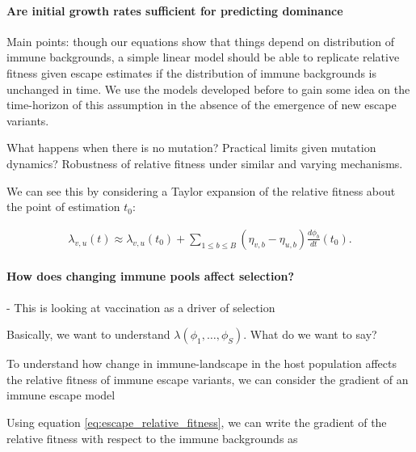 \documentclass[12pt,oneside,letterpaper]{article}
\begin{document}
\paragraph{Are initial growth rates sufficient for predicting dominance}%

Main points: though our equations show that things depend on distribution of immune backgrounds, a simple linear model should be able to replicate relative fitness given escape estimates if the distribution of immune backgrounds is unchanged in time.
We use the models developed before to gain some idea on the time-horizon of this assumption in the absence of the emergence of new escape variants.

What happens when there is no mutation? Practical limits given mutation dynamics?
Robustness of relative fitness under similar and varying mechanisms.

We can see this by considering a Taylor expansion of the relative fitness about the point of estimation $t_{0}$:

\begin{align*}
    \lambda_{v,u}(t) \approx \lambda_{v,u}(t_{0}) + \sum_{1\leq b \leq B} (\eta_{v, b} - \eta_{u,b}) \frac{d\phi_b}{dt}(t_0).
\end{align*}



\paragraph{How does changing immune pools affect selection?}%
- This is looking at vaccination as a driver of selection

Basically, we want to understand $\lambda(\phi_{1}, \ldots, \phi_{S})$. What do we want to say?

To understand how change in immune-landscape in the host population affects the relative fitness of immune escape variants, we can consider the gradient of an immune escape model

Using equation \ref{eq:escape_relative_fitness}, we can write the gradient of the relative fitness with respect to the immune backgrounds as
\end{document}
